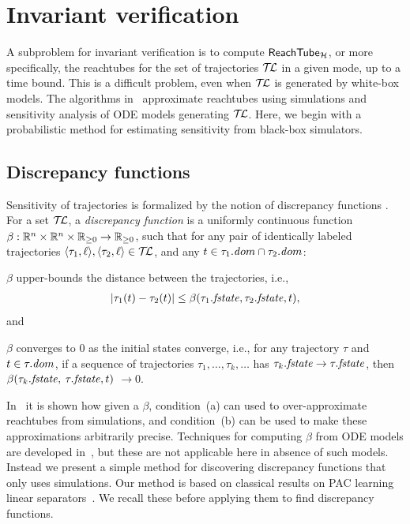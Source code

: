 
\section{Invariant verification}
\label{sec:reachalgo}

A subproblem for invariant verification is to
compute ${\sf ReachTube}_{{\mathcal H}}$, or more specifically, the reachtubes for the set of trajectories $\mathcal{T\mkern-3mu L}$ in a given mode, up to a time bound.
%
This is a difficult problem, even when $\mathcal{T\mkern-3mu L}$ is generated by white-box models.
%
The algorithms in~\cite{donze2010breach,DMV:EMSOFT2013,FanMitra:2015df} approximate reachtubes using simulations and sensitivity analysis of ODE models generating $\mathcal{T\mkern-3mu L}$.
%
Here, we begin with a probabilistic method for estimating sensitivity from black-box simulators.
 

\subsection{Discrepancy functions}
\label{sec:disc}

Sensitivity of trajectories is formalized by the notion of discrepancy
functions \cite{DMV:EMSOFT2013}.  For a set 
$\mathcal{T\mkern-3mu L}$, a {\em discrepancy function\/} is a uniformly continuous
function $\beta: \reals^n \times \reals^n \times \nnreals \rightarrow
\nnreals$, such that for any pair of identically labeled trajectories
$\langle \tau_1,\ell \rangle, \langle \tau_2, \ell \rangle \in \mathcal{T\mkern-3mu L}$,
and any $t \in \tau_1.{\mathit dom} \cap \tau_2.{\mathit dom}$:
\begin{inparaenum}[(a)]
	\item $\beta$ upper-bounds the distance between the trajectories, i.e., 
	\begin{align}
	|\tau_1(t) - \tau_2(t)|  \leq \beta(\tau_1.\mathit{fstate},\tau_2.\mathit{fstate},t), \label{eq:discrepancy}
	\end{align} and
	\item $\beta$ converges to $0$ as the initial states converge, i.e., for any trajectory $\tau$ and $t \in
          \tau.{\mathit dom}$, if a sequence of trajectories $\tau_1,\ldots,
          \tau_k, \ldots$ has $\tau_k.\mathit{fstate} \rightarrow
          \tau.\mathit{fstate}$, then $\beta(\tau_k.\mathit{fstate},$
          $\tau.\mathit{fstate},t)$ $\rightarrow 0$.
\end{inparaenum}
In~\cite{DMV:EMSOFT2013} it is shown how given a $\beta$, condition~(a) can used to over-approximate reachtubes  from simulations, 
and condition~(b) can be used to make these approximations arbitrarily precise. 
%
Techniques for computing $\beta$ from ODE models are developed in~\cite{FanMitra:2015df,FanM:EMSOFT2016,HFMMK:CAV2014}, but these are not applicable here in absence of such models. Instead we present a simple method for discovering discrepancy functions that only uses simulations. Our method is based on classical results on PAC learning linear separators~\cite{KearnsVazirani}. We recall these before applying them to find discrepancy functions.
\vspace{-10pt}
